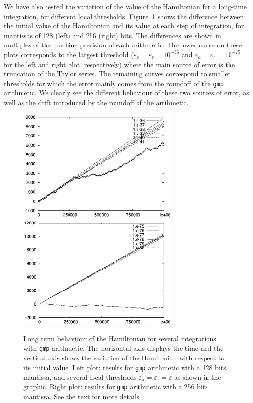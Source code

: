 \documentclass[12pt,twoside]{article}
\begin{document}
We have also tested the variation of the value of the Hamiltonian for
a long-time integration, for different local thresholds.
Figure~\ref{fig:ham-gmp} shows the difference between the initial
value of the Hamiltonian and its value at each step of integration,
for mantissas of 128 (left) and 256 (right) bits. The differences are
shown in multiples of the machine precision of each arithmetic.  The
lower curve on these plots corresponds to the largest threshold
($\varepsilon_a=\varepsilon_r=10^{-36}$ and
$\varepsilon_a=\varepsilon_r=10^{-75}$ for the left and right plot,
respectively) where the main source of error is the truncation of the
Taylor series.  The remaining curves correspond to smaller thresholds
for which the error mainly comes from the roundoff of the \texttt{gmp}
arithmetic.  We clearly see the different behaviour of these two
sources of error, as well as the drift introduced by the roundoff of
the artihmetic.

\begin{figure}
\includegraphics[width=80mm]{eps/drift-gmp128.eps}\hfill
\includegraphics[width=80mm]{eps/drift-gmp256.eps}
\caption{Long term behaviour of the Hamiltonian for several
  integrations with \texttt{gmp} arithmetic. The horizontal axis
  displays the time and the vertical axis shows the variation of the
  Hamitonian with respect to its initial value. Left plot: results for
  \texttt{gmp} arithmetic with a 128 bits mantissa, and several local
  thresholds $\varepsilon_a=\varepsilon_r=\varepsilon$ as shown in the
  graphic. Right plot: results for \texttt{gmp} arithmetic with a 256
  bits mantissa. See the text for more details.}
\label{fig:ham-gmp}
\end{figure}
\end{document}
